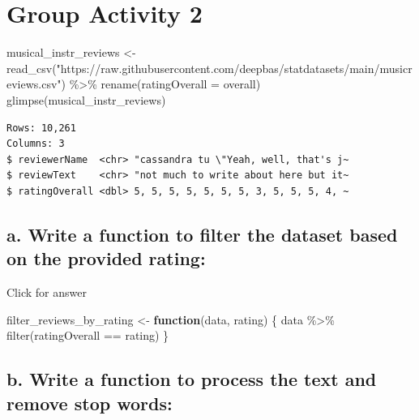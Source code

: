 \documentclass[
]{book}
\newenvironment{Shaded}{\begin{snugshade}}{\end{snugshade}}
\newcommand{\AttributeTok}[1]{\textcolor[rgb]{0.77,0.63,0.00}{#1}}
\newcommand{\ControlFlowTok}[1]{\textcolor[rgb]{0.13,0.29,0.53}{\textbf{#1}}}
\newcommand{\FunctionTok}[1]{\textcolor[rgb]{0.00,0.00,0.00}{#1}}
\newcommand{\NormalTok}[1]{#1}
\newcommand{\OtherTok}[1]{\textcolor[rgb]{0.56,0.35,0.01}{#1}}
\newcommand{\SpecialCharTok}[1]{\textcolor[rgb]{0.00,0.00,0.00}{#1}}
\newcommand{\StringTok}[1]{\textcolor[rgb]{0.31,0.60,0.02}{#1}}
\begin{document}
\hypertarget{group-activity-2-1}{%
\section{Group Activity 2}\label{group-activity-2-1}}

\begin{Shaded}
\begin{Highlighting}[]
\NormalTok{musical\_instr\_reviews }\OtherTok{\textless{}{-}}  \FunctionTok{read\_csv}\NormalTok{(}\StringTok{"https://raw.githubusercontent.com/deepbas/statdatasets/main/musicreviews.csv"}\NormalTok{) }\SpecialCharTok{\%\textgreater{}\%} 
  \FunctionTok{rename}\NormalTok{(}\AttributeTok{ratingOverall =}\NormalTok{ overall)}
\FunctionTok{glimpse}\NormalTok{(musical\_instr\_reviews)}
\end{Highlighting}
\end{Shaded}

\begin{verbatim}
Rows: 10,261
Columns: 3
$ reviewerName  <chr> "cassandra tu \"Yeah, well, that's j~
$ reviewText    <chr> "not much to write about here but it~
$ ratingOverall <dbl> 5, 5, 5, 5, 5, 5, 5, 3, 5, 5, 5, 4, ~
\end{verbatim}

\hypertarget{a.-write-a-function-to-filter-the-dataset-based-on-the-provided-rating}{%
\subsection{a. Write a function to filter the dataset based on the provided rating:}\label{a.-write-a-function-to-filter-the-dataset-based-on-the-provided-rating}}

Click for answer

\begin{Shaded}
\begin{Highlighting}[]
\NormalTok{filter\_reviews\_by\_rating }\OtherTok{\textless{}{-}} \ControlFlowTok{function}\NormalTok{(data, rating) \{}
\NormalTok{  data }\SpecialCharTok{\%\textgreater{}\%} \FunctionTok{filter}\NormalTok{(ratingOverall }\SpecialCharTok{==}\NormalTok{ rating)}
\NormalTok{\}}
\end{Highlighting}
\end{Shaded}

\hypertarget{b.-write-a-function-to-process-the-text-and-remove-stop-words}{%
\subsection{b. Write a function to process the text and remove stop words:}\label{b.-write-a-function-to-process-the-text-and-remove-stop-words}}
\end{document}
